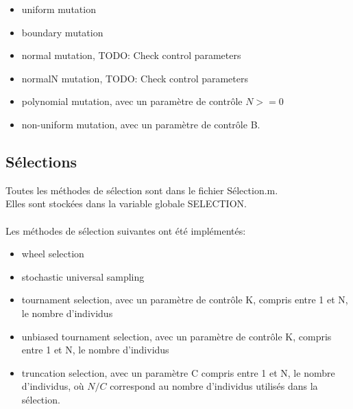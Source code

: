 \documentclass[12pt, letterpaper]{article}
\begin{document}
\begin{itemize}
\item uniform mutation\\
  
\item boundary mutation\\
  
\item normal mutation, TODO: Check control parameters\\
  
\item normalN mutation, TODO: Check control parameters\\
  
\item polynomial mutation, avec un paramètre de contrôle $N >= 0$\\
  
\item non-uniform mutation, avec un paramètre de contrôle B.\\
\end{itemize}

\subsection{Sélections}

Toutes les méthodes de sélection sont dans le fichier Sélection.m.\\
Elles sont stockées dans la variable globale SELECTION.
\\\\
Les méthodes de sélection suivantes ont été implémentés:

\begin{itemize}
  
\item wheel selection\\
	
\item stochastic universal sampling\\
	
\item tournament selection, avec un paramètre de contrôle K, compris
  entre 1 et N, le nombre d'individus\\
	
\item unbiased tournament selection, avec un paramètre de contrôle K,
  compris entre 1 et N, le nombre d'individus\\
	
\item truncation selection, avec un paramètre C compris entre 1 et N,
  le nombre d'individus, où $N/C$ correspond au nombre d'individus
  utilisés dans la sélection.\\
\end{itemize}
\end{document}
